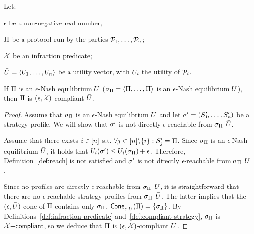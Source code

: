 \begin{proposition}\label{prop:eq_comp}
    Let:
    \begin{inparaenum}[i)]
        \item $\epsilon$ be a non-negative real number;
        \item $\Pi$ be a protocol run by the parties $\mathcal{P}_1, \ldots, \mathcal{P}_n$;
        \item $\mathcal{X}$ be an infraction predicate;
        \item $\bar{U}=\langle U_1, \ldots, U_n \rangle$ be a utility vector, with $U_i$ the utility of $\mathcal{P}_i$.
    \end{inparaenum}
    If $\Pi$ is an $\epsilon$-Nash equilibrium \wrt $\bar{U}$ (\ie $\sigma_\Pi=\langle \Pi, \ldots, \Pi \rangle$ is an $\epsilon$-Nash equilibrium \wrt $\bar{U}$), then $\Pi$ is $(\epsilon, \mathcal{X})$-compliant \wrt $\bar{U}$.
\end{proposition}
\begin{proof}
Assume that $\sigma_\Pi$ is an $\epsilon$-Nash equilibrium \wrt $\bar{U}$ and let $\sigma'=(S'_1, \ldots, S'_n)$ be a strategy profile. We will show that $\sigma'$ is not directly $\epsilon$-reachable from $\sigma_\Pi$ \wrt $\bar{U}$.

Assume that there exists $i \in [n]$ s.t. $\forall j \in [n] \backslash\{i\}: S'_j = \Pi$. Since $\sigma_\Pi$ is an $\epsilon$-Nash equilibrium \wrt $\bar{U}$, it holds that $U_i(\sigma') \leq U_i(\sigma_\Pi) + \epsilon$. Therefore, Definition~\ref{def:reach} is not satisfied and $\sigma'$ is not directly $\epsilon$-reachable from $\sigma_\Pi$ \wrt $\bar{U}$.

Since no profiles are directly $\epsilon$-reachable from $\sigma_\Pi$ \wrt $\bar{U}$, it is straightforward that there are no $\epsilon$-reachable strategy profiles from $\sigma_\Pi$ \wrt $\bar{U}$. The latter implies that the $(\epsilon, \bar{U})$-cone of $\Pi$ contains only $\sigma_\Pi$, \ie $\mathsf{Cone}_{\epsilon,\bar{U}}(\Pi) = \{ \sigma_\Pi\}$. By Definitions~\ref{def:infraction-predicate} and~\ref{def:compliant-strategy}, $\sigma_\Pi$ is $\mathcal{X}\mathsf{-compliant}$, so we deduce that $\Pi$ is $(\epsilon,\mathcal{X})$-compliant \wrt $\bar{U}$.
\end{proof}
